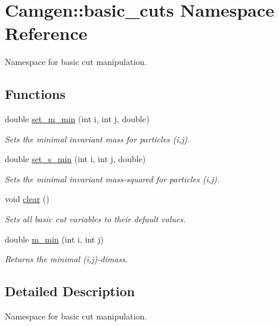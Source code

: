 \hypertarget{a00879}{}\section{Camgen\+:\+:basic\+\_\+cuts Namespace Reference}
\label{a00879}


Namespace for basic cut manipulation.  


\subsection*{Functions}
\begin{DoxyCompactItemize}
\item 
double \hyperlink{a00879_a2c6ac3377c1cfcca9c07fd789eb6d8a1}{set\+\_\+m\+\_\+min} (int i, int j, double)
\begin{DoxyCompactList}\small\item\em Sets the minimal invariant mass for particles (i,j). \end{DoxyCompactList}\item 
double \hyperlink{a00879_a06768fc1ac5f34d8657a1b1dfd0a104d}{set\+\_\+s\+\_\+min} (int i, int j, double)
\begin{DoxyCompactList}\small\item\em Sets the minimal invariant mass-\/squared for particles (i,j). \end{DoxyCompactList}\item 
\hypertarget{a00879_a7a908084900d0916765a80c48cbde675}{}void \hyperlink{a00879_a7a908084900d0916765a80c48cbde675}{clear} ()\label{a00879_a7a908084900d0916765a80c48cbde675}

\begin{DoxyCompactList}\small\item\em Sets all basic cut variables to their default values. \end{DoxyCompactList}\item 
\hypertarget{a00879_ad9a932146d48ae43b7f29776cd917921}{}double \hyperlink{a00879_ad9a932146d48ae43b7f29776cd917921}{m\+\_\+min} (int i, int j)\label{a00879_ad9a932146d48ae43b7f29776cd917921}

\begin{DoxyCompactList}\small\item\em Returns the minimal (i,j)-\/dimass. \end{DoxyCompactList}\end{DoxyCompactItemize}


\subsection{Detailed Description}
Namespace for basic cut manipulation. 

